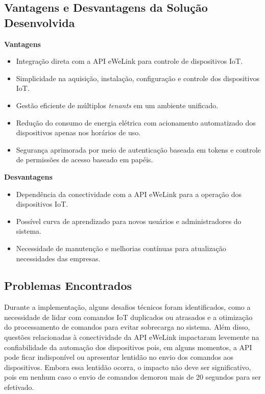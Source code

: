 \subsection{Vantagens e Desvantagens da Solução Desenvolvida}

\noindent\textbf{Vantagens}\\
\begin{itemize}
    \item Integração direta com a API eWeLink para controle de dispositivos IoT.
    \item Simplicidade na aquisição, instalação, configuração e controle dos dispositivos IoT. 
    \item Gestão eficiente de múltiplos \textit{tenants} em um ambiente unificado.
    \item Redução do consumo de energia elétrica com acionamento automatizado dos dispositivos apenas nos horários de uso.
    \item Segurança aprimorada por meio de autenticação baseada em tokens e controle de permissões de acesso baseado em papéis.
\end{itemize}

\noindent\textbf{Desvantagens}\\
\begin{itemize}
    \item Dependência da conectividade com a API eWeLink para a operação dos dispositivos IoT.
    \item Possível curva de aprendizado para novos usuários e administradores do sistema.
    \item Necessidade de manutenção e melhorias contínuas para atualização necessidades das empresas.
\end{itemize}

\subsection{Problemas Encontrados}

Durante a implementação, alguns desafios técnicos foram identificados, como a necessidade de lidar com comandos IoT duplicados ou atrasados e a otimização do processamento de comandos para evitar sobrecarga no sistema. Além disso, questões relacionadas à conectividade da API eWeLink impactaram levemente na confiabilidade da automação dos dispositivos pois, em alguns momentos, a API pode ficar indisponível ou apresentar lentidão no envio dos comandos aos dispositivos. Embora essa lentidão ocorra, o impacto não deve ser significativo, pois em nenhum caso o envio de comandos demorou mais de 20 segundos para ser efetivado.

